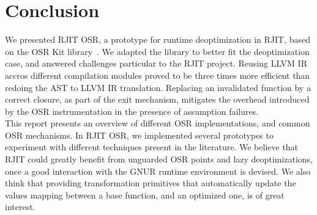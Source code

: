 
\chapter{Conclusion} %

\label{Chapter6} %


\newcommand{\keyword}[1]{\textbf{#1}}
\newcommand{\tabhead}[1]{\textbf{#1}}
\newcommand{\code}[1]{\texttt{#1}}
\newcommand{\file}[1]{\texttt{\bfseries#1}}
\newcommand{\option}[1]{\texttt{\itshape#1}}


  

We presented RJIT OSR, a prototype for runtime deoptimization in RJIT, based on the OSR Kit library~\cite{OSRKit}.
We adapted the library to better fit the deoptimization case, and answered challenges particular to the RJIT project.
Reusing LLVM IR accros different compilation modules proved to be three times more efficient than redoing the AST to LLVM IR translation.
Replacing an invalidated function by a correct closure, as part of the exit mechanism, mitigates the overhead introduced by the OSR instrumentation in the presence of assumption failures.\\

This report presents an overview of different OSR implementations, and common OSR mechanisms.
In RJIT OSR, we implemented several prototypes to experiment with different techniques present in the literature.
We believe that RJIT could greatly benefit from unguarded OSR points and lazy deoptimizations, once a good interaction with the GNUR runtime environment is devised.
We also think that providing transformation primitives that automatically update the values mapping between a base function, and an optimized one, is of great interest.\\

